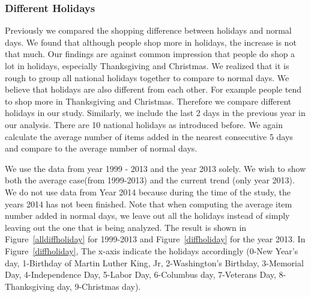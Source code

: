 \subsubsection{Different Holidays}
Previously we compared the shopping difference between holidays and normal days. We found that although people shop more in holidays, the increase is not that much. Our findings are against common impression that people do shop a lot in holidays, especially Thanksgiving and Christmas. We realized that it is rough to group all national holidays together to compare to normal days. We believe that holidays are also different from each other. For example people tend to shop more in Thanksgiving and Christmas. Therefore we compare different holidays in our study. Similarly, we include the last 2 days in the previous year in our analysis. There are 10 national holidays as introduced before. We again calculate the average number of items added in the nearest consecutive 5 days and compare to the average number of normal days. 

We use the data from year 1999 - 2013 and the year 2013 solely. We wish to show both the average case(from 1999-2013) and the current trend (only year 2013). We do not use data from Year 2014 because during the time of the study, the years 2014 has not been finished. Note that when computing the average item number added in normal days, we leave out all the holidays instead of simply leaving out the one that is being analyzed. The result is shown in Figure~\ref{alldiffholiday} for 1999-2013 and Figure~\ref{diffholiday} for the year 2013. In Figure~\ref{diffholiday}, The x-axis indicate the holidays accordingly (0-New Year's day, 1-Birthday of Martin Luther King, Jr, 2-Washington's Birthday, 3-Memorial Day, 4-Independence Day, 5-Labor Day, 6-Columbus day, 7-Veterans Day, 8-Thanksgiving day, 9-Christmas day).


